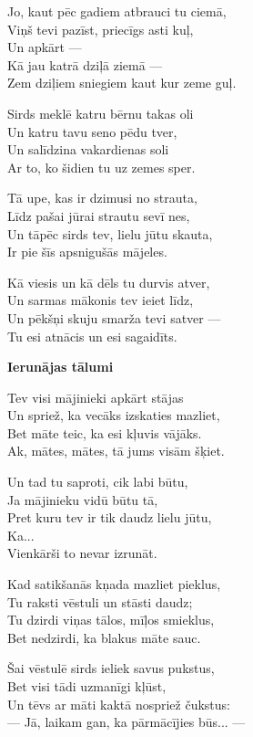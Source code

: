 \documentclass[14pt]{extarticle}
\begin{document}
{{Jo, kaut pēc gadiem atbrauci tu ciemā,\\
Viņš tevi pazīst, priecīgs asti kuļ,\\
Un apkārt ---\\
Kā jau katrā dziļā ziemā ---\\
Zem dziļiem sniegiem kaut kur zeme guļ. 

Sirds meklē katru bērnu takas oli\\
Un katru tavu seno pēdu tver,\\
Un salīdzina vakardienas soli\\
Ar to, ko šidien tu uz zemes sper.

Tā upe, kas ir dzimusi no strauta,\\
Līdz pašai jūrai strautu sevī nes,\\
Un tāpēc sirds tev, lielu jūtu skauta,\\
Ir pie šīs apsnigušās mājeles.

Kā viesis un kā dēls tu durvis atver,\\
Un sarmas mākonis tev ieiet līdz,\\
Un pēkšņi skuju smarža tevi satver ---\\
Tu esi atnācis un esi sagaidīts. 


\newpage

{\bf Ierunājas tālumi}

Tev visi mājinieki apkārt stājas\\
Un spriež, ka vecāks izskaties mazliet,\\
Bet māte teic, ka esi kļuvis vājāks.\\
Ak, mātes, mātes, tā jums visām šķiet. 

Un tad tu saproti, cik labi būtu,\\
Ja mājinieku vidū būtu tā,\\
Pret kuru tev ir tik daudz lielu jūtu,\\
Ka...\\
Vienkārši to nevar izrunāt. 

Kad satikšanās kņada mazliet pieklus,\\
Tu raksti vēstuli un stāsti daudz;\\
Tu dzirdi viņas tālos, mīļos smieklus,\\
Bet nedzirdi, ka blakus māte sauc. 

Šai vēstulē sirds ieliek savus pukstus,\\
Bet visi tādi uzmanīgi kļūst,\\
Un tēvs ar māti kaktā nospriež čukstus:\\
--- Jā, laikam gan, ka pārmācījies būs... --- 

}}
\end{document}

